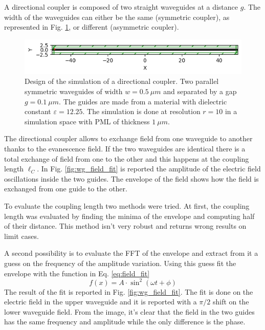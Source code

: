 
A directional coupler is composed of two straight waveguides at a distance $g$. The width of the waveguides can either be the same (symmetric coupler), as represented in Fig. \ref{fig:wg_design}, or different (asymmetric coupler).

\begin{figure}[H]
    \centering
    \includegraphics[width=0.8\linewidth]{Figures/wg_design.png}
    \caption{Design of the simulation of a directional coupler. Two parallel symmetric waveguides of width \(w=0.5\ \mu m\) and separated by a gap \(g=0.1\ \mu m\). The guides are made from a material with dielectric constant \(\varepsilon = 12.25\). The simulation is done at resolution \(r=10\) in a simulation space with PML of thickness \(1\ \mu m\).}
    \label{fig:wg_design}
\end{figure}

The directional coupler allows to exchange field from one waveguide to another thanks to the evanescence field. If the two waveguides are identical there is a total exchange of field from one to the other and this happens at the coupling length $\ell_C$. In Fig. \ref{fig:wg_field_fit} is reported the amplitude of the electric field oscillations inside the two guides. The envelope of the field shows how the field is exchanged from one guide to the other.

To evaluate the coupling length two methods were tried. At first, the coupling length was evaluated by finding the minima of the envelope and computing half of their distance. This method isn't very robust and returns wrong results on limit cases.

A second possibility is to evaluate the FFT of the envelope and extract from it a guess on the frequency of the amplitude variation. Using this guess fit the envelope with the function in Eq. \ref{eq:field_fit}
\begin{equation} \label{eq:field_fit}
    f(x) = A \cdot \sin^2{(\omega t + \phi)}
\end{equation}
The result of the fit is reported in Fig. \ref{fig:wg_field_fit}. The fit is done on the electric field in the upper waveguide and it is reported with a $\pi / 2$ shift on the lower waveguide field. From the image, it's clear that the field in the two guides has the same frequency and amplitude while the only difference is the phase.

